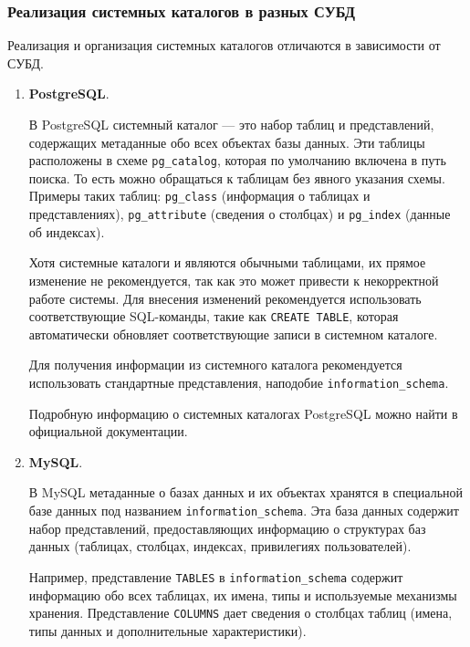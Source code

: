 \subsubsection{Реализация системных каталогов в разных СУБД}

Реализация и организация системных каталогов отличаются в зависимости от СУБД.

\begin{enumerate}
    \item \textbf{PostgreSQL}. \autocite{PostgreSQLdocc51,HabrDataOrgp1,YTcoursepostgre}
    
    В PostgreSQL системный каталог — это набор таблиц и представлений, содержащих метаданные обо всех объектах базы данных. Эти таблицы расположены в схеме \texttt{pg\_catalog}, которая по умолчанию включена в путь поиска. То есть можно обращаться к таблицам без явного указания схемы. Примеры таких таблиц: \texttt{pg\_class} (информация о таблицах и представлениях), \texttt{pg\_attribute} (сведения о столбцах) и \texttt{pg\_index} (данные об индексах). \autocite{PostgreSQLdocc51}

    Хотя системные каталоги и являются обычными таблицами, их прямое изменение не рекомендуется, так как это может привести к некорректной работе системы. Для внесения изменений рекомендуется использовать соответствующие SQL-команды, такие как \texttt{CREATE TABLE}, которая автоматически обновляет соответствующие записи в системном каталоге.

    Для получения информации из системного каталога рекомендуется использовать стандартные представления, наподобие \texttt{information\_schema}.

    Подробную информацию о системных каталогах PostgreSQL можно найти в официальной документации. \autocite{PostgreSQLdocc51}

    \item \textbf{MySQL}.
    
    В MySQL метаданные о базах данных и их объектах хранятся в специальной базе данных под названием \texttt{information\_schema}. Эта база данных содержит набор представлений, предоставляющих информацию о структурах баз данных (таблицах, столбцах, индексах, привилегиях пользователей).

    Например, представление \texttt{TABLES} в \texttt{information\_schema} содержит информацию обо всех таблицах, их имена, типы и используемые механизмы хранения. Представление \texttt{COLUMNS} дает сведения о столбцах таблиц (имена, типы данных и дополнительные характеристики).


\end{enumerate}
